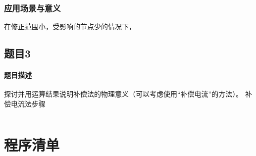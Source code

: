 \documentclass[a4paper,12pt]{article}
\begin{document}
    \subsubsection{应用场景与意义}
    在修正范围小，受影响的节点少的情况下，

    \subsection{题目3}
    \paragraph{题目描述} 探讨并用运算结果说明补偿法的物理意义（可以考虑使用“补偿电流”的方法）。
    补偿电流法步骤

    \begin{lstlisting}[style=Matlab-editor,basicstyle=\mlttfamily,label=lst:q2q1p2,caption={补偿电流法}]
    \end{lstlisting}

    \newpage
    
    
    \appendix
    \section{程序清单}
      
      
      
      
      
      
      
      
    \label{applastpage}
\iffalse
\begin{itemize}[noitemsep,topsep=0pt]
\end{itemize}
\begin{enumerate}[label=\Roman{*}.,noitemsep,topsep=0pt]
\end{enumerate}
\begin{multicols}{2}
\end{multicols}
\fi
\end{document}
